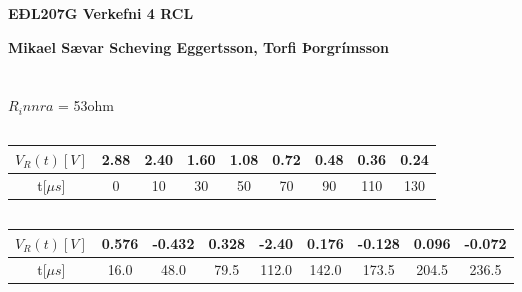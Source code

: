 \documentclass[12pt]{article}
\begin{document}
\centerline{\bf \Huge EÐL207G Verkefni 4 RCL}
\centerline{\bf Mikael Sævar Scheving Eggertsson, Torfi Þorgrímsson}

\centerline{\bf \large }

\tableofcontents

\section{}
\subsection{}

$R_innra$ = 53ohm

\subsection{}
\begin{table}[H]
    \begin{tabular}{|c|c|c|c|c|c|c|c|c|}
    \hline
    $V_R(t) [V]$  & 2.88 & 2.40 & 1.60 & 1.08 & 0.72 & 0.48 & 0.36 & 0.24  \\
    \hline
    t[$\mu s$] & 0 & 10 & 30 & 50 & 70 & 90 & 110 & 130  \\
    \hline
    \end{tabular}
\end{table}
 

\subsection{}
\begin{table}[H]
    \begin{tabular}{|c|c|c|c|c|c|c|c|c|}
    \hline
    $V_R(t) [V]$  & 0.576 & -0.432 & 0.328 & -2.40 & 0.176 & -0.128 & 0.096 & -0.072 \\
    \hline
    t[$\mu s$]    & 16.0 & 48.0 & 79.5 & 112.0 & 142.0 & 173.5 & 204.5 & 236.5 \\
    \hline
    \end{tabular}
\end{table}


\end{document}
